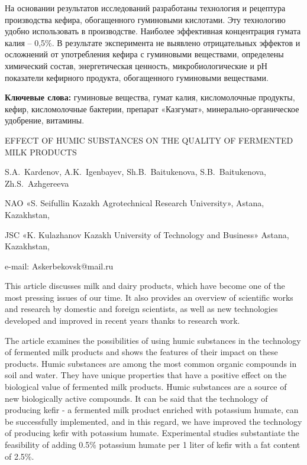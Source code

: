 На основании результатов исследований разработаны технология и рецептура
производства кефира, обогащенного гуминовыми кислотами. Эту технологию
удобно использовать в производстве. Наиболее эффективная концентрация
гумата калия -- 0,5\%. В результате эксперимента не выявлено
отрицательных эффектов и осложнений от употребления кефира с гуминовыми
веществами, определены химический состав, энергетическая ценность,
микробиологические и рН показатели кефирного продукта, обогащенного
гуминовыми веществами.

{\bfseries Ключевые слова:} гуминовые вещества, гумат калия, кисломолочные
продукты, кефир, кисломолочные бактерии, препарат «Казгумат»,
минерально-органическое удобрение, витамины.

\begin{header}
EFFECT OF HUMIC SUBSTANCES ON THE QUALITY OF FERMENTED MILK PRODUCTS

S.A.~Kardenov\envelope,
A.K.~Igenbayev,
Sh.B.~Baitukenova,
S.B.~Baitukenova,
Zh.S.~Azhgereeva
\end{header}

\begin{affil}
NAO «S. Seifullin Kazakh Agrotechnical Research University», Astana, Kazakhstan,

JSC «K. Kulazhanov Kazakh University of Technology and Business» Astana, Kazakhstan,

e-mail: Askerbekovsk@mail.ru
\end{affil}

This article discusses milk and dairy products, which have become one of
the most pressing issues of our time. It also provides an overview of
scientific works and research by domestic and foreign scientists, as
well as new technologies developed and improved in recent years thanks
to research work.

The article examines the possibilities of using humic substances in the
technology of fermented milk products and shows the features of their
impact on these products. Humic substances are among the most common
organic compounds in soil and water. They have unique properties that
have a positive effect on the biological value of fermented milk
products. Humic substances are a source of new biologically active
compounds. It can be said that the technology of producing kefir - a
fermented milk product enriched with potassium humate, can be
successfully implemented, and in this regard, we have improved the
technology of producing kefir with potassium humate. Experimental
studies substantiate the feasibility of adding 0.5\% potassium humate
per 1 liter of kefir with a fat content of 2.5\%.

